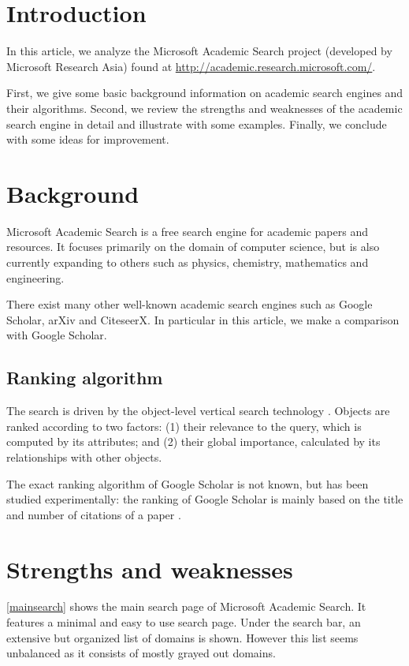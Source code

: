 \documentclass[12pt]{article}
\begin{document}
\section{Introduction}
In this article, we analyze the Microsoft Academic Search project (developed by Microsoft Research Asia) found at \url{http://academic.research.microsoft.com/}. 

First, we give some basic background information on academic search engines and their algorithms.
Second, we review the strengths and weaknesses of the academic search engine in detail and illustrate with some examples.
Finally, we conclude with some ideas for improvement.

\section{Background}
Microsoft Academic Search is a free search engine for academic papers and resources. It focuses primarily on the domain of computer science, but is also currently expanding to others such as physics, chemistry, mathematics and engineering. 

There exist many other well-known academic search engines such as Google Scholar, arXiv and CiteseerX. In particular in this article, we make a comparison with Google Scholar. 

\subsection{Ranking algorithm}
The search is driven by the object-level vertical search technology \cite{objectlevel}. Objects are ranked according to two factors: (1) their relevance to the query, which is computed by its attributes; and (2) their global importance, calculated by its relationships with other objects.

The exact ranking algorithm of Google Scholar is not known, but has been studied experimentally: the ranking of Google Scholar is mainly based on the title and number of citations of a paper \cite{googlescholarranking}.

\section{Strengths and weaknesses}
\autoref{mainsearch} shows the main search page of Microsoft Academic Search. It features a minimal and easy to use search page. Under the search bar, an extensive but organized list of domains is shown. However this list seems unbalanced as it consists of mostly grayed out domains.
\end{document}
